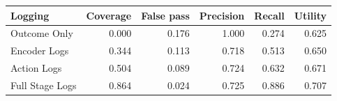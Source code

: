 \begin{tabular}{lrrrrr}
\toprule
Logging & Coverage & False pass & Precision & Recall & Utility \\
\midrule
Outcome Only & 0.000 & 0.176 & 1.000 & 0.274 & 0.625 \\
Encoder Logs & 0.344 & 0.113 & 0.718 & 0.513 & 0.650 \\
Action Logs & 0.504 & 0.089 & 0.724 & 0.632 & 0.671 \\
Full Stage Logs & 0.864 & 0.024 & 0.725 & 0.886 & 0.707 \\
\bottomrule
\end{tabular}
